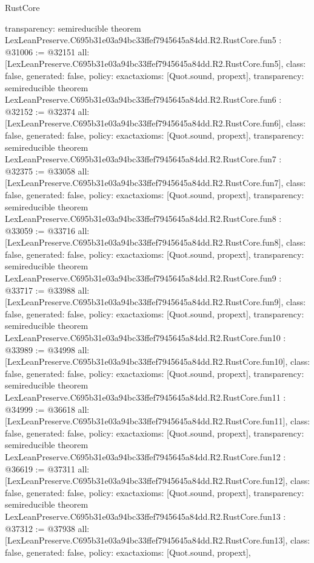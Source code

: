 \begin{lexlean}{RustCore}
\begin{coremodule}
{  transparency: semireducible
}
theorem LexLeanPreserve.C695b31e03a94bc33ffef7945645a84dd.R2.RustCore.fun5 : @31006 := @32151 {
  all: [LexLeanPreserve.C695b31e03a94bc33ffef7945645a84dd.R2.RustCore.fun5],
  class: false,
  generated: false,
  policy: exact{axioms: [Quot.sound, propext]},
  transparency: semireducible
}
theorem LexLeanPreserve.C695b31e03a94bc33ffef7945645a84dd.R2.RustCore.fun6 : @32152 := @32374 {
  all: [LexLeanPreserve.C695b31e03a94bc33ffef7945645a84dd.R2.RustCore.fun6],
  class: false,
  generated: false,
  policy: exact{axioms: [Quot.sound, propext]},
  transparency: semireducible
}
theorem LexLeanPreserve.C695b31e03a94bc33ffef7945645a84dd.R2.RustCore.fun7 : @32375 := @33058 {
  all: [LexLeanPreserve.C695b31e03a94bc33ffef7945645a84dd.R2.RustCore.fun7],
  class: false,
  generated: false,
  policy: exact{axioms: [Quot.sound, propext]},
  transparency: semireducible
}
theorem LexLeanPreserve.C695b31e03a94bc33ffef7945645a84dd.R2.RustCore.fun8 : @33059 := @33716 {
  all: [LexLeanPreserve.C695b31e03a94bc33ffef7945645a84dd.R2.RustCore.fun8],
  class: false,
  generated: false,
  policy: exact{axioms: [Quot.sound, propext]},
  transparency: semireducible
}
theorem LexLeanPreserve.C695b31e03a94bc33ffef7945645a84dd.R2.RustCore.fun9 : @33717 := @33988 {
  all: [LexLeanPreserve.C695b31e03a94bc33ffef7945645a84dd.R2.RustCore.fun9],
  class: false,
  generated: false,
  policy: exact{axioms: [Quot.sound, propext]},
  transparency: semireducible
}
theorem LexLeanPreserve.C695b31e03a94bc33ffef7945645a84dd.R2.RustCore.fun10 : @33989 := @34998 {
  all: [LexLeanPreserve.C695b31e03a94bc33ffef7945645a84dd.R2.RustCore.fun10],
  class: false,
  generated: false,
  policy: exact{axioms: [Quot.sound, propext]},
  transparency: semireducible
}
theorem LexLeanPreserve.C695b31e03a94bc33ffef7945645a84dd.R2.RustCore.fun11 : @34999 := @36618 {
  all: [LexLeanPreserve.C695b31e03a94bc33ffef7945645a84dd.R2.RustCore.fun11],
  class: false,
  generated: false,
  policy: exact{axioms: [Quot.sound, propext]},
  transparency: semireducible
}
theorem LexLeanPreserve.C695b31e03a94bc33ffef7945645a84dd.R2.RustCore.fun12 : @36619 := @37311 {
  all: [LexLeanPreserve.C695b31e03a94bc33ffef7945645a84dd.R2.RustCore.fun12],
  class: false,
  generated: false,
  policy: exact{axioms: [Quot.sound, propext]},
  transparency: semireducible
}
theorem LexLeanPreserve.C695b31e03a94bc33ffef7945645a84dd.R2.RustCore.fun13 : @37312 := @37938 {
  all: [LexLeanPreserve.C695b31e03a94bc33ffef7945645a84dd.R2.RustCore.fun13],
  class: false,
  generated: false,
  policy: exact{axioms: [Quot.sound, propext]},
}
\end{coremodule}
\end{lexlean}
